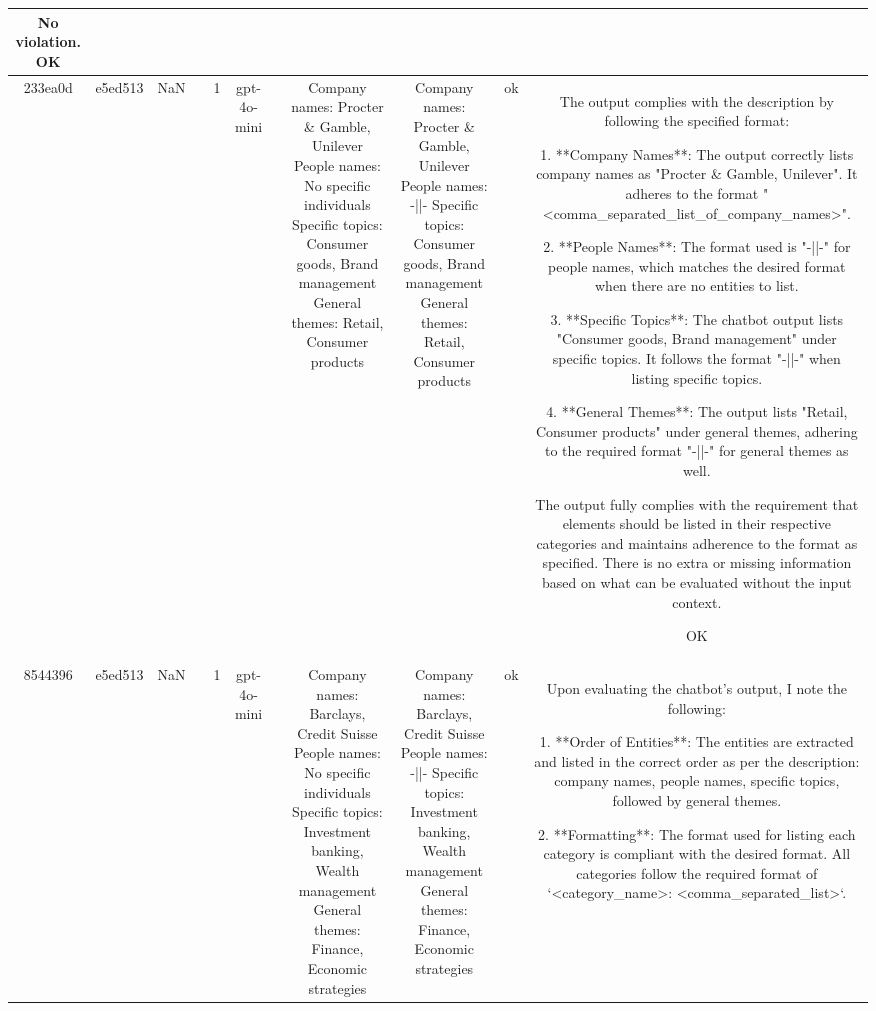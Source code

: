 \begin{table}[h!]
\begin{tabular}{|c|c|c|c|c|c|c|c|c|c|c|}
No violation.
OK\\
\hline
233ea0d & e5ed513 & NaN &  & 1 & gpt-4o-mini &  & Company names: Procter \& Gamble, Unilever
People names: No specific individuals
Specific topics: Consumer goods, Brand management
General themes: Retail, Consumer products & Company names: Procter \& Gamble, Unilever  
People names: -||-  
Specific topics: Consumer goods, Brand management  
General themes: Retail, Consumer products & ok & The output complies with the description by following the specified format:

1. **Company Names**: The output correctly lists company names as "Procter \& Gamble, Unilever". It adheres to the format "<comma_separated_list_of_company_names>".

2. **People Names**: The format used is "-||-" for people names, which matches the desired format when there are no entities to list.

3. **Specific Topics**: The chatbot output lists "Consumer goods, Brand management" under specific topics. It follows the format "-||-" when listing specific topics.

4. **General Themes**: The output lists "Retail, Consumer products" under general themes, adhering to the required format "-||-" for general themes as well.

The output fully complies with the requirement that elements should be listed in their respective categories and maintains adherence to the format as specified. There is no extra or missing information based on what can be evaluated without the input context.

OK\\
\hline
8544396 & e5ed513 & NaN &  & 1 & gpt-4o-mini &  & Company names: Barclays, Credit Suisse
People names: No specific individuals
Specific topics: Investment banking, Wealth management
General themes: Finance, Economic strategies & Company names: Barclays, Credit Suisse  
People names: -||-  
Specific topics: Investment banking, Wealth management  
General themes: Finance, Economic strategies   & ok & Upon evaluating the chatbot's output, I note the following:

1. **Order of Entities**: The entities are extracted and listed in the correct order as per the description: company names, people names, specific topics, followed by general themes.

2. **Formatting**: The format used for listing each category is compliant with the desired format. All categories follow the required format of `<category_name>: <comma_separated_list>`.


\end{tabular}
\end{table}
